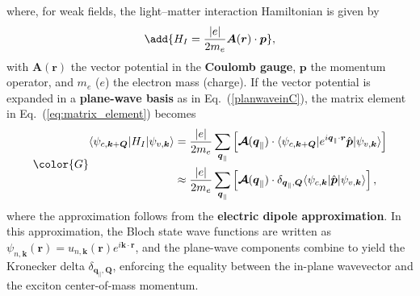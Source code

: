 where, for weak fields, the  light--matter interaction Hamiltonian is given by~\cite{peng2022tailoring, sanchez2024enhanced}
\[
\add{H_I=\frac{|e|}{2m_e}\boldsymbol{A}(\boldsymbol{r})\cdot\boldsymbol{p}},
\]
with $\boldsymbol{A}(\boldsymbol{r})$ the vector potential in the \textbf{Coulomb gauge}, $\boldsymbol{p}$ the momentum operator, and $m_e$ ($e$) the electron mass (charge).
If the vector potential is expanded in a \textbf{plane-wave basis} as in Eq.~(\ref{planwaveinC}), the matrix element in Eq.~(\ref{eq:matrix_element}) becomes
\begin{equation}
\color{G} 
\begin{aligned}
\langle\psi_{c, \boldsymbol{k}+\boldsymbol{Q}}|H_I|\psi_{v, \boldsymbol{k}}\rangle
&= \frac{|e|}{2m_e} 
\sum_{\boldsymbol{q}_\parallel} 
\left[ 
\boldsymbol{\mathcal{A}}(\boldsymbol{q}_\parallel)  \cdot
\langle\psi_{c, \boldsymbol{k}+\boldsymbol{Q}}|
e^{i\boldsymbol{q}_\parallel \cdot \boldsymbol{r}} 
\hat{\boldsymbol{p}} 
|\psi_{v, \boldsymbol{k}}\rangle
\right] \\
&\approx \frac{|e|}{2m_e} 
\sum_{\boldsymbol{q}_\parallel} 
\left[
\boldsymbol{\mathcal{A}}(\boldsymbol{q}_\parallel)  \cdot
\delta_{\boldsymbol{q}_\parallel,\boldsymbol{Q}} 
\langle\psi_{c, \boldsymbol{k}}| 
\hat{\boldsymbol{p}} 
|\psi_{v, \boldsymbol{k}}\rangle
\right],
\end{aligned}
\end{equation}
where the approximation follows from the \textbf{electric dipole approximation}. In this approximation, the Bloch state wave functions are written as $\psi_{n, \boldsymbol{k}}(\boldsymbol{r})=u_{n, \boldsymbol{k}}(\boldsymbol{r}) e^{i\boldsymbol{k}\cdot \boldsymbol{r}}$, and the plane-wave components combine to yield the Kronecker delta $\delta_{\boldsymbol{q}_\parallel,\boldsymbol{Q}}$, enforcing the equality between the in-plane wavevector and the exciton center-of-mass momentum.

